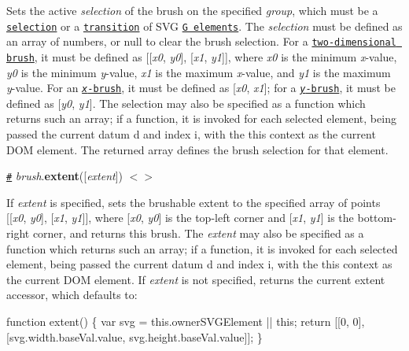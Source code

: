 Sets the active {\itshape selection} of the brush on the specified {\itshape group}, which must be a \href{https://github.com/d3/d3-selection}{\tt selection} or a \href{https://github.com/d3/d3-transition}{\tt transition} of S\+VG \href{https://www.w3.org/TR/SVG/struct.html#Groups}{\tt G elements}. The {\itshape selection} must be defined as an array of numbers, or null to clear the brush selection. For a \href{#brush}{\tt two-\/dimensional brush}, it must be defined as \mbox{[}\mbox{[}{\itshape x0}, {\itshape y0}\mbox{]}, \mbox{[}{\itshape x1}, {\itshape y1}\mbox{]}\mbox{]}, where {\itshape x0} is the minimum {\itshape x}-\/value, {\itshape y0} is the minimum {\itshape y}-\/value, {\itshape x1} is the maximum {\itshape x}-\/value, and {\itshape y1} is the maximum {\itshape y}-\/value. For an \href{#brushX}{\tt {\itshape x}-\/brush}, it must be defined as \mbox{[}{\itshape x0}, {\itshape x1}\mbox{]}; for a \href{#brushY}{\tt {\itshape y}-\/brush}, it must be defined as \mbox{[}{\itshape y0}, {\itshape y1}\mbox{]}. The selection may also be specified as a function which returns such an array; if a function, it is invoked for each selected element, being passed the current datum {\ttfamily d} and index {\ttfamily i}, with the {\ttfamily this} context as the current D\+OM element. The returned array defines the brush selection for that element.

\href{#brush_extent}{\tt \#} {\itshape brush}.{\bfseries extent}(\mbox{[}{\itshape extent}\mbox{]}) \href{https://github.com/d3/d3-brush/blob/master/src/brush.js#L521}{\tt $<$$>$}

If {\itshape extent} is specified, sets the brushable extent to the specified array of points \mbox{[}\mbox{[}{\itshape x0}, {\itshape y0}\mbox{]}, \mbox{[}{\itshape x1}, {\itshape y1}\mbox{]}\mbox{]}, where \mbox{[}{\itshape x0}, {\itshape y0}\mbox{]} is the top-\/left corner and \mbox{[}{\itshape x1}, {\itshape y1}\mbox{]} is the bottom-\/right corner, and returns this brush. The {\itshape extent} may also be specified as a function which returns such an array; if a function, it is invoked for each selected element, being passed the current datum {\ttfamily d} and index {\ttfamily i}, with the {\ttfamily this} context as the current D\+OM element. If {\itshape extent} is not specified, returns the current extent accessor, which defaults to\+:


\begin{DoxyCode}
function extent() \{
  var svg = this.ownerSVGElement || this;
  return [[0, 0], [svg.width.baseVal.value, svg.height.baseVal.value]];
\}
\end{DoxyCode}


